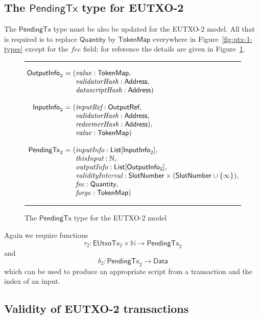 \documentclass[a4paper]{article}
\renewcommand{\i}{\textit}  %
\newcommand{\s}{\textsf}  %
\newenvironment{arraydefs}[1]{\setlength{\arraycolsep}{0pt}\begin{array}{#1}}{\end{array}}
\newcommand\rfskip{7pt}
\newenvironment{ruledfigure}[1]{\begin{figure}[#1]\hrule\vspace{\rfskip}}{\vspace{\rfskip}\hrule\end{figure}}
\newcommand{\List}[1]{\ensuremath{\s{List}[#1]}}
\newcommand{\ptx}{\ensuremath{\s{PendingTx}}}
\newcommand{\mi}[1]{\ensuremath{\mathit{#1}}}
\newcommand{\forge}{\mi{forge}}
\newcommand{\fee}{\mi{fee}}
\newcommand{\Data}{\ensuremath{\mathsf{Data}}}
\newcommand{\msf}[1]{\ensuremath{\mathsf{#1}}}
\newcommand{\slotnum}{\msf{SlotNumber}}
\newcommand{\eutxotx}{\msf{EUtxoTx}}
\newcommand{\qty}{\ensuremath{\s{Quantity}}}
\newcommand{\tokenmap}{\ensuremath{\s{TokenMap}}}
\newcommand\N{\ensuremath{\mathbb{N}}}
\begin{document}
\subsection{The $\ptx$ type for EUTXO-2}
\label{sec:pendingtx-2}
The $\ptx$ type must be also be updated for the EUTXO-2 model.  All
that is required is to replace $\qty$ by $\tokenmap$ everywhere in
Figure~\ref{fig:ptx-1-types} except for the $\fee$ field: for reference
the details are given in Figure~\ref{fig:ptx-2-types}.
\begin{ruledfigure}{H}
  \[
  \begin{arraydefs}{rll}
    
    \s{OutputInfo}_2\s{ } &= (& \i{value}: \tokenmap,\\
    && \i{validatorHash}: \s{Address},\\
    &&  \i{datascriptHash}: \s{Address})\\
    \\
    \s{InputInfo}_2\s{ }& = (&\i{inputRef}: \s{OutputRef},\\
                 && \i{validatorHash}: \s{Address},\\
                 && \i{redeemerHash}: \s{Address}),\\
                 && \i{value}: \tokenmap)\\
     \\
     \ptx_2\s{ } &= (&\i{inputInfo}: \List{\s{InputInfo}_2},\\
     &&\i{thisInput}: \N,\\
     &&\i{outputInfo}: \List{\s{OutputInfo$_2$}},\\
     &&\i{validityInterval}: \slotnum \times (\slotnum \cup \{\infty\}),\\
     &&\fee: \qty,\\
     &&\forge: \tokenmap)
   \end{arraydefs}
 \]
  \caption{The $\ptx$ type for the EUTXO-2 model}
  \label{fig:ptx-2-types}
\end{ruledfigure}

\noindent Again we require functions
$$
\tau_2: \eutxotx_2 \times \N \rightarrow \ptx_2
$$
and
$$
\delta_2: \ptx_2 \rightarrow \Data
$$
which can be used to produce an appropriate script from a transaction
and the index of an input.

\subsection{Validity of EUTXO-2 transactions}
\label{sec:eutxo-2-validity}
\end{document}
